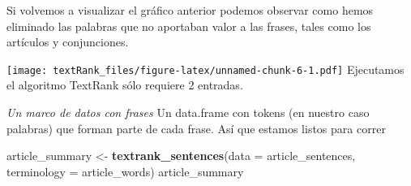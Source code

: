 \documentclass[]{article}
\newenvironment{Shaded}{\begin{snugshade}}{\end{snugshade}}
\newcommand{\KeywordTok}[1]{\textcolor[rgb]{0.13,0.29,0.53}{\textbf{#1}}}
\newcommand{\DataTypeTok}[1]{\textcolor[rgb]{0.13,0.29,0.53}{#1}}
\newcommand{\DecValTok}[1]{\textcolor[rgb]{0.00,0.00,0.81}{#1}}
\newcommand{\StringTok}[1]{\textcolor[rgb]{0.31,0.60,0.02}{#1}}
\newcommand{\OtherTok}[1]{\textcolor[rgb]{0.56,0.35,0.01}{#1}}
\newcommand{\OperatorTok}[1]{\textcolor[rgb]{0.81,0.36,0.00}{\textbf{#1}}}
\newcommand{\NormalTok}[1]{#1}
\begin{document}
Si volvemos a visualizar el gráfico anterior podemos observar como hemos
eliminado las palabras que no aportaban valor a las frases, tales como
los artículos y conjunciones.

\begin{Shaded}
\end{Shaded}

\texttt{[image: textRank\_files/figure-latex/unnamed-chunk-6-1.pdf]}
Ejecutamos el algoritmo TextRank sólo requiere 2 entradas.

\emph{Un marco de datos con frases }Un data.frame con tokens (en nuestro
caso palabras) que forman parte de cada frase. Así que estamos listos
para correr

\begin{Shaded}
\begin{Highlighting}[]
\NormalTok{article_summary <-}\StringTok{ }\KeywordTok{textrank_sentences}\NormalTok{(}\DataTypeTok{data =}\NormalTok{ article_sentences, }
                                      \DataTypeTok{terminology =}\NormalTok{ article_words)}
\NormalTok{article_summary}
\end{Highlighting}
\end{Shaded}
\end{document}
